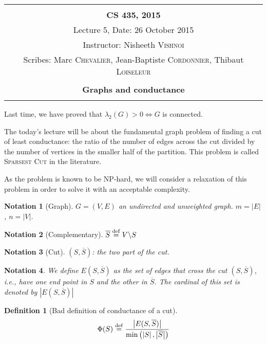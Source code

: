 \documentclass[12pt]{article}
\newtheorem{definition}[lemma]{Definition}
\newtheorem{notation}{Notation}
\newcommand{\defeq}{\stackrel{{\rm def}}{=}}
\newcommand{\LRa}{\Leftrightarrow}
\newcommand{\card}[1]{\left\lvert#1\right\rvert}
\newcommand{\NP}{\textsc{NP}}
\begin{document}
\begin{center}
\begin{tabular}{|c|}
\hline
\\
{\bf CS 435, 2015} \\
 Lecture 5, Date: 26 October 2015\\
Instructor: Nisheeth \textsc{Vishnoi} \\
Scribes: Marc \textsc{Chevalier}, Jean-Baptiste \textsc{Cordonnier}, Thibaut \textsc{Loiseleur} \\ \\
{\bfseries \large Graphs and conductance} \\ \\ \hline
\end{tabular}
\end{center}


Last time, we have proved that $\lambda_2(G) > 0 \LRa G$ is connected.

The today's lecture will be about the fundamental graph problem of finding a cut of least conductance: the ratio of the number of edges across the cut divided by the number of vertices in the smaller half of the partition. This problem is called \textsc{Sparsest Cut} in the literature.

As the problem is known to be \NP-hard, we will consider a relaxation of this problem in order to solve it with an acceptable complexity.


\begin{notation}[Graph]
    $G = (V,E)$ an undirected and unweighted graph. $m=\lvert E\rvert$, $n=\lvert V\rvert$.
\end{notation}

\begin{notation}[Complementary]
    $\overline{S}\defeq V\backslash S$
\end{notation}

\begin{notation}[Cut]
    $(S,\overline{S})$: the two part of the cut.
\end{notation}
    
\begin{notation}
    We define $E(S,\overline{S})$ as the set of edges that cross the cut  $(S,\overline{S})$, i.e., have one end point in $S$ and the other in $\overline{S}$. The cardinal of this set is denoted by $\card{E(S,\overline{S})}$
\end{notation}    
    
\begin{definition}[Bad definition of conductance of a cut]
    \[
        \Phi(S) \defeq \frac{\card{E(S,\overline{S})}}{\min\left(\card{S},\card{\overline{S}}\right)}
    \]
\end{definition}
\end{document}
